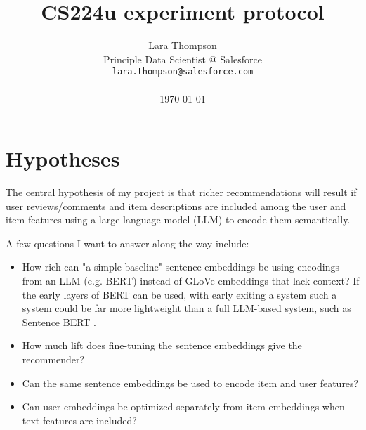 \documentclass[11pt]{article}
\title{CS224u experiment protocol}
\author{Lara Thompson \\
  Principle Data Scientist @ Salesforce \\
  \texttt{lara.thompson@salesforce.com} \\ \\
  \today
}
\begin{document}
\maketitle





\section{Hypotheses} 

The central hypothesis of my project is that richer recommendations will result if user reviews/comments and item descriptions are included among the user and item features using a large language model (LLM) to encode them semantically.

A few questions I want to answer along the way include:
\begin{itemize}
  \item How rich can "a simple baseline" sentence embeddings \cite{Arora2017} be using encodings from an LLM (e.g. BERT) instead of GLoVe embeddings that lack context? If the early layers of BERT can be used, with early exiting a system such a system could be far more lightweight than a full LLM-based system, such as Sentence BERT \cite{Reimers2019}. 
  \item How much lift does fine-tuning the sentence embeddings give the recommender?
  \item Can the same sentence embeddings be used to encode item and user features?
  \item Can user embeddings be optimized separately from item embeddings when text features are included?
\end{itemize}
\end{document}
